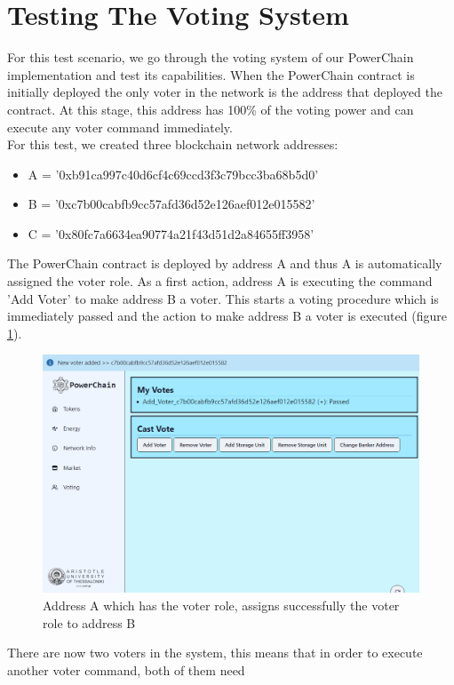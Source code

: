 \section{Testing The Voting System}
For this test scenario, we go through the voting system of our PowerChain implementation and test its capabilities.
When the PowerChain contract is initially deployed the only voter in the network is the address that deployed the contract.
At this stage, this address has 100\% of the voting power and can execute any voter command immediately.\\
For this test, we created three blockchain network addresses: 
\begin{itemize}
    \item A = '0xb91ca997c40d6cf4c69ccd3f3c79bcc3ba68b5d0'
    \item B = '0xc7b00cabfb9cc57afd36d52e126aef012e015582'
    \item C = '0x80fc7a6634ea90774a21f43d51d2a84655ff3958'
\end{itemize}
The PowerChain contract is deployed by address A and thus A is automatically assigned the voter role.
As a first action, address A is executing the command 'Add Voter' to make address B a voter. This starts 
a voting procedure which is immediately passed and the action to make address B a voter is executed (figure \ref{fig:voter_added}).
\begin{figure}[h!]
    \centering
    \includegraphics[width=\linewidth,frame,scale=0.7]{Figures/voter_added.png}
    \caption{Address A which has the voter role, assigns successfully the voter role to address B}
    \label{fig:voter_added}
\end{figure}
There are now two voters in the system, this means that in order to execute another voter command, both of them need
